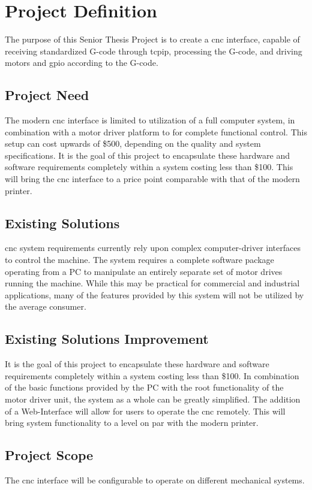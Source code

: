 \chapter{Project Definition}
The purpose of this Senior Thesis Project is to create a \gls{cnc} interface, capable of receiving standardized G-code through \gls{tcpip}, processing the G-code, and driving motors and \gls{gpio} according to the G-code. 

\section{Project Need}
The modern \gls{cnc} interface is limited to utilization of a full computer system, in combination with a motor driver platform to for complete functional control.
This setup can cost upwards of \$500, depending on the quality and system specifications.
It is the goal of this project to encapsulate these hardware and software requirements completely within a system costing less than \$100.
This will bring the \gls{cnc} interface to a price point comparable with that of the modern printer. 

\section{Existing Solutions}
\gls{cnc} system requirements currently rely upon complex computer-driver interfaces to control the machine.
The system requires a complete software package operating from a PC to manipulate an entirely separate set of motor drives running the machine.
While this may be practical for commercial and industrial applications, many of the features provided by this system will not be utilized by the average consumer.

\section{Existing Solutions Improvement}
It is the goal of this project to encapsulate these hardware and software requirements completely within a system costing less than \$100.
In combination of the basic functions provided by the PC with the root functionality of the motor driver unit, the system as a whole can be greatly simplified.
The addition of a Web-Interface will allow for users to operate the \gls{cnc} remotely.
This will bring system functionality to a level on par with the modern printer.

\section{Project Scope}
The \gls{cnc} interface will be configurable to operate on different mechanical systems. 

